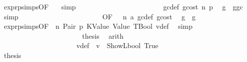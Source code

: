 \begin{isabellebody}
\ expr{\isachardot}{\kern0pt}psimps{\isacharparenleft}{\kern0pt}{}{}{\isacharparenright}{\kern0pt}{\isacharbrackleft}{\kern0pt}OF\ {}{}{\isacharparenleft}{\kern0pt}{}{\isacharparenright}{\kern0pt}{\isacharbrackright}{\kern0pt}\ \isamarkupfalse%
\ simp\isanewline
\ \ \ \ \ \ \ \ \ \ \ \ \ \ \ \ \ \ \ \ \isamarkupfalse%
\ \isamarkupfalse%
\ {}{}{\isacharparenleft}{\kern0pt}{}{\isacharparenright}{\kern0pt}\ gc{\isacharunderscore}{\kern0pt}def\ gcost\ n\ p{}\ \isamarkupfalse%
\ {\isachardoublequoteopen}g{\isacharprime}{\kern0pt}\ {\isasymle}\ g{\isacharminus}{\kern0pt}gc{\isachardoublequoteclose}\ \isamarkupfalse%
\ simp\isanewline
\ \ \ \ \ \ \ \ \ \ \ \ \ \ \ \ \ \ \ \ \isamarkupfalse%
\ \isamarkupfalse%
\ {}{}{\isacharparenleft}{\kern0pt}{}{\isacharparenright}{\kern0pt}{\isacharbrackleft}{\kern0pt}OF\ {\isacharunderscore}{\kern0pt}\ {\isacharunderscore}{\kern0pt}\ n{\isacharbrackright}{\kern0pt}\ a{}\ gc{\isacharunderscore}{\kern0pt}def\ gcost\ \isamarkupfalse%
\ {\isachardoublequoteopen}g{}{\isacharprime}{\kern0pt}\ {\isasymle}\ g{\isacharprime}{\kern0pt}{\isachardoublequoteclose}\ \isamarkupfalse%
\ expr{\isachardot}{\kern0pt}psimps{\isacharparenleft}{\kern0pt}{}{}{\isacharparenright}{\kern0pt}{\isacharbrackleft}{\kern0pt}OF\ {}{}{\isacharparenleft}{\kern0pt}{}{\isacharparenright}{\kern0pt}{\isacharbrackright}{\kern0pt}\ n\ Pair\ p{}\ KValue\ Value\ TBool\ v{\isacharunderscore}{\kern0pt}def\ \isamarkupfalse%
\ simp\isanewline
\ \ \ \ \ \ \ \ \ \ \ \ \ \ \ \ \ \ \ \ \isamarkupfalse%
\ \isamarkupfalse%
\ {\isacharquery}{\kern0pt}thesis\ \isamarkupfalse%
\ arith\isanewline
\ \ \ \ \ \ \ \ \ \ \ \ \ \ \ \ \ \ \ \isamarkupfalse%
\isanewline
\ \ \ \ \ \ \ \ \ \ \ \ \ \ \ \ \ \ \ \ \isamarkupfalse%
\ v{\isacharunderscore}{\kern0pt}def{\isacharcolon}{\kern0pt}\ {\isachardoublequoteopen}{\isasymnot}\ v\ {\isacharequal}{\kern0pt}\ ShowL\isactrlsub b\isactrlsub o\isactrlsub o\isactrlsub l\ True{\isachardoublequoteclose}\isanewline
\ \ \ \ \ \ \ \ \ \ \ \ \ \ \ \ \ \ \ \ \isamarkupfalse%
\ \isamarkupfalse%
\ {\isacharquery}{\kern0pt}thesis\isanewline

\end{isabellebody}
